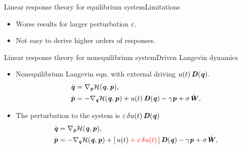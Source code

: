 \documentclass[fleqn]{beamer}
\newcommand{\redc}[1]{{\color{red} #1}}
\newcommand{\bluec}[1]{{\color{blue} #1}}
\newcommand{\vect}[1]{\textbf{\textit{#1}}}
\newcommand{\fe}{u}
\newcommand{\mh}{\mathcal H}
\newcommand{\eps}{\varepsilon}
\begin{document}
\begin{frame}{Linear response theory for equilibrium system}{Limitations}
  \begin{itemize}\itemsep 1cm
  \item <1-> Worse results for larger perturbation \bluec{$\eps$}.
  \item <2-> Not easy to derive higher orders of responses.
  \end{itemize}
\end{frame}



\begin{frame}{Linear response theory for nonequilibrium system}{Driven Langevin dynamics}
  \begin{itemize}
  \item <1-> Nonequilibrium
    Langevin eqn. with external driving \bluec{$\fe(t)\,\vect D(\vect q)$}.
    \bluec{
      \begin{align*}
        \dot{\vect q} & = \nabla_{\vect p}\mh(\vect q,\vect p), \\
        \dot{\vect p} & =- \nabla_{\vect q}\mh(\vect q,\vect p)
        + \fe(t)\, \vect D(\vect q)
        - \gamma\vect p
        + \sigma\dot{\vect W},
      \end{align*}
    }
  \item <2-> 
    The perturbation to the system is \redc{$\eps\,\delta \fe(t)\,\vect D(\vect q)$}
    \bluec{
      \begin{align*}
        \dot{\vect q} & = \nabla_{\vect p}\mh(\vect q,\vect p), \\
        \dot{\vect p} & =- \nabla_{\vect q}\mh(\vect q,\vect p)
        + [\,\fe(t)\redc{ \:+\: \eps\,\delta \fe(t)}\,]\, \vect D(\vect q)
        - \gamma\vect p
        + \sigma\dot{\vect W},
      \end{align*}
    }
  \end{itemize}
\end{frame}
\end{document}
